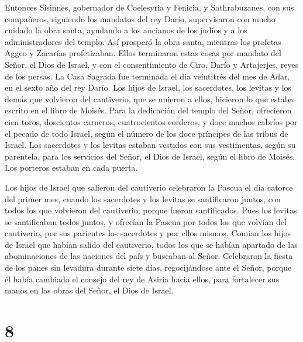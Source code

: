  Entonces Sisinnes, gobernador de Coelesyria y Fenicia, y
Sathrabuzanes, con sus compañeros, siguiendo los mandatos del rey Darío,
 supervisaron con mucho cuidado la obra santa, ayudando a
los ancianos de los judíos y a los administradores del templo.
 Así prosperó la obra santa, mientras los profetas Aggeo y
Zacarías profetizaban.  Ellos terminaron estas cosas por
mandato del Señor, el Dios de Israel, y con el consentimiento de Ciro,
Darío y Artajerjes, reyes de los persas.  La Casa Sagrada
fue terminada el día veintitrés del mes de Adar, en el sexto año del rey
Darío.  Los hijos de Israel, los sacerdotes, los levitas y
los demás que volvieron del cautiverio, que se unieron a ellos, hicieron
lo que estaba escrito en el libro de Moisés.  Para la
dedicación del templo del Señor, ofrecieron cien toros, doscientos
carneros, cuatrocientos corderos,  y doce machos cabríos
por el pecado de todo Israel, según el número de los doce príncipes de
las tribus de Israel.  Los sacerdotes y los levitas
estaban vestidos con sus vestimentas, según su parentela, para los
servicios del Señor, el Dios de Israel, según el libro de Moisés. Los
porteros estaban en cada puerta.

 Los hijos de Israel que salieron del cautiverio
celebraron la Pascua el día catorce del primer mes, cuando los
sacerdotes y los levitas se santificaron juntos,  con
todos los que volvieron del cautiverio; porque fueron santificados. Pues
los levitas se santificaban todos juntos,  y ofrecían la
Pascua por todos los que volvían del cautiverio, por sus parientes los
sacerdotes y por ellos mismos.  Comían los hijos de
Israel que habían salido del cautiverio, todos los que se habían
apartado de las abominaciones de las naciones del país y buscaban al
Señor.  Celebraron la fiesta de los panes sin levadura
durante siete días, regocijándose ante el Señor,  porque
él había cambiado el consejo del rey de Asiria hacia ellos, para
fortalecer sus manos en las obras del Señor, el Dios de Israel.

\hypertarget{section-7}{%
\section{8}\label{section-7}}

